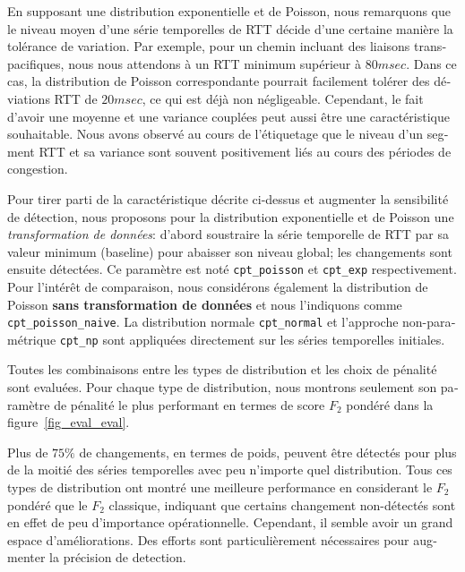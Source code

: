 \begin{otherlanguage}{french}
En supposant une distribution exponentielle et de Poisson, 
nous remarquons que le niveau moyen d'une série temporelles de RTT décide d'une certaine manière la tolérance de variation.
Par exemple, pour un chemin incluant des liaisons transpacifiques, nous nous attendons à un RTT minimum supérieur à $80msec$.
Dans ce cas, la distribution de Poisson correspondante pourrait facilement tolérer des déviations RTT de $20msec$, 
ce qui est déjà non négligeable.
Cependant, le fait d'avoir une moyenne et une variance couplées peut aussi être une caractéristique souhaitable.
Nous avons observé au cours de l'étiquetage que le niveau d'un segment RTT et sa variance sont souvent positivement liés au cours des périodes de congestion.

Pour tirer parti de la caractéristique décrite ci-dessus et augmenter la sensibilité de détection, 
nous proposons pour la distribution exponentielle et de Poisson une \textit{transformation de données}: 
d'abord soustraire la série temporelle de RTT par sa valeur minimum (baseline) pour abaisser son niveau global; 
les changements sont ensuite détectées.
Ce paramètre est noté \texttt{cpt\_poisson} et \texttt{cpt\_exp} respectivement.
Pour l'intérêt de comparaison, nous considérons également la distribution de Poisson \textbf{sans transformation de données} 
et nous l'indiquons comme \texttt{cpt\_poisson\_naive}.
La distribution normale \texttt{cpt\_normal} et l'approche non-paramétrique \texttt{cpt\_np} 
sont appliquées directement sur les séries temporelles initiales.

Toutes les combinaisons entre les types de distribution et les choix de pénalité sont evaluées.
Pour chaque type de distribution, nous montrons seulement son paramètre de pénalité le plus performant en termes de score $F_2$ pondéré dans la figure~\ref {fig_eval_eval}.

Plus de $75\%$ de changements, en termes de poids, peuvent être détectés 
pour plus de la moitié des séries temporelles avec peu n'importe quel distribution.
Tous ces types de distribution ont montré une meilleure performance en considerant le $F_2$ pondéré que le $F_2$ classique, 
indiquant que certains changement non-détectés sont en effet de peu d'importance opérationnelle.
Cependant, il semble avoir un grand espace d'améliorations.
Des efforts sont particulièrement nécessaires pour augmenter la précision de detection.


\end{otherlanguage}
